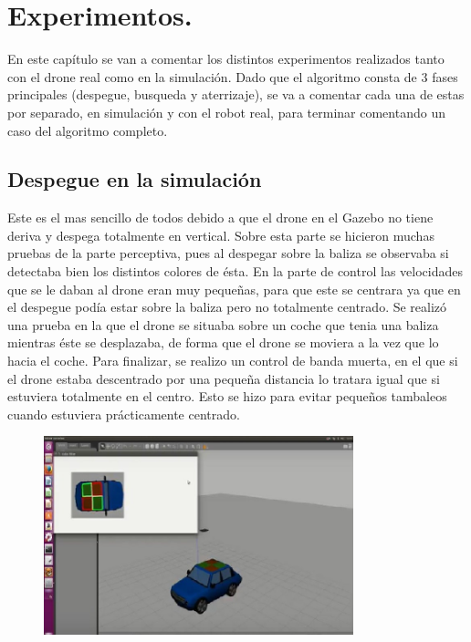 \chapter{Experimentos.}\label{cap.experimentos}
\hspace{1cm} En este cap\'itulo se van a comentar los distintos experimentos realizados tanto con el drone real como en la simulaci\'on. Dado que el algoritmo consta de 3 fases principales (despegue, busqueda y aterrizaje), se va a comentar cada una de estas por separado, en simulaci\'on y con el robot real, para terminar comentando un caso del algoritmo completo. 

\section{Despegue en la simulaci\'on}
\hspace{1cm} Este es el mas sencillo de todos debido a que el drone en el Gazebo no tiene deriva y despega totalmente en vertical. Sobre esta parte se hicieron muchas pruebas de la parte perceptiva, pues al despegar sobre la baliza se observaba si detectaba bien los distintos colores de \'esta. En la parte de control las velocidades que se le daban al drone eran muy pequeñas, para que este se centrara ya que en el despegue pod\'ia estar sobre la baliza pero no totalmente centrado. 
\hspace{1cm} Se realiz\'o una prueba en la que el drone se situaba sobre un coche que tenia una baliza mientras \'este se desplazaba, de forma que el drone se moviera a la vez que lo hacia el coche. 
\hspace{1cm} Para finalizar, se realizo un control de banda muerta, en el que si el drone estaba descentrado por una pequeña distancia lo tratara igual que si estuviera totalmente en el centro. Esto se hizo para evitar pequeños tambaleos cuando estuviera pr\'acticamente centrado. 


\begin{figure}[H]
	\centering
		\includegraphics[width=0.8\textwidth]{imgs/TakeOff.jpg}
	\label{fig:Despegue sobre la baliza del coche.}
\end{figure}

